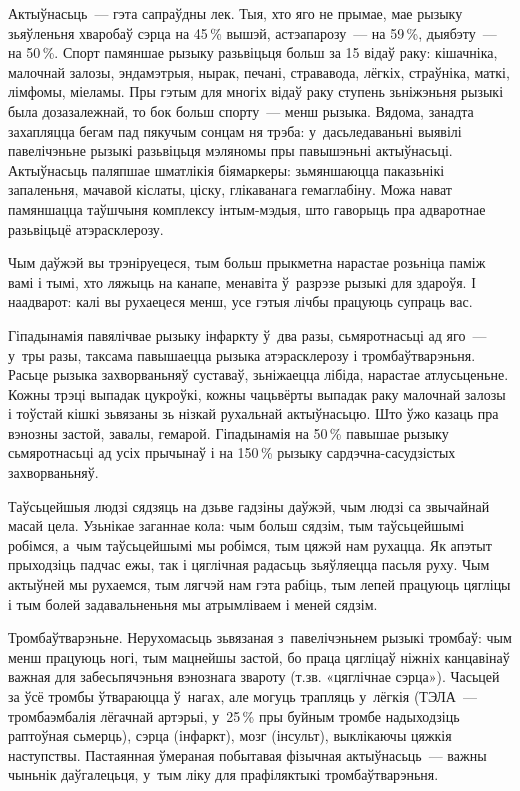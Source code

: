 Актыўнасьць~--- гэта сапраўдны лек. Тыя, хто яго не прымае, мае рызыку зьяўленьня хваробаў сэрца на 45\,\% вышэй, астэапарозу~--- на 59\,\%, дыябэту~--- на 50\,\%. Спорт памяншае рызыку разьвіцьця больш за 15 відаў раку: кішачніка, малочнай залозы, эндамэтрыя, нырак, печані, стрававода, лёгкіх, страўніка, маткі, лімфомы, міеламы. Пры гэтым для многіх відаў раку ступень зьніжэньня рызыкі была дозазалежнай, то бок больш спорту~--- менш рызыка. Вядома, занадта захапляцца бегам пад пякучым сонцам ня трэба: у~дасьледаваньні выявілі павелічэньне рызыкі разьвіцьця мэляномы пры павышэньні актыўнасьці. Актыўнасьць паляпшае шматлікія біямаркеры: зьмяншаюцца паказьнікі запаленьня, мачавой кіслаты, ціску, глікаванага гемаглабіну. Можа нават памяншацца таўшчыня комплексу інтым-мэдыя, што гаворыць пра адваротнае разьвіцьцё атэрасклерозу.

Чым даўжэй вы трэніруецеся, тым больш прыкметна нарастае розьніца паміж вамі і тымі, хто ляжыць на канапе, менавіта ў~разрэзе рызыкі для здароўя. І наадварот: калі вы рухаецеся менш, усе гэтыя лічбы працуюць супраць вас.

Гіпадынамія павялічвае рызыку інфаркту ў~два разы, сьмяротнасьці ад яго~--- у~тры разы, таксама павышаецца рызыка атэрасклерозу і тромбаўтварэньня. Расьце рызыка захворваньняў суставаў, зьніжаецца лібіда, нарастае атлусьценьне. Кожны трэці выпадак цукроўкі, кожны чацьвёрты выпадак раку малочнай залозы і тоўстай кішкі зьвязаны зь нізкай рухальнай актыўнасьцю. Што ўжо казаць пра вэнозны застой, завалы, гемарой. Гіпадынамія на 50\,\% павышае рызыку сьмяротнасьці ад усіх прычынаў і на 150\,\% рызыку сардэчна-сасудзістых захворваньняў.

Таўсьцейшыя людзі сядзяць на дзьве гадзіны даўжэй, чым людзі са звычайнай масай цела. Узьнікае заганнае кола: чым больш сядзім, тым таўсьцейшымі робімся, а~чым таўсьцейшымі мы робімся, тым цяжэй нам рухацца. Як апэтыт прыходзіць падчас ежы, так і цяглічная радасьць зьяўляецца пасьля руху. Чым актыўней мы рухаемся, тым лягчэй нам гэта рабіць, тым лепей працуюць цягліцы і тым болей задавальненьня мы атрымліваем і меней сядзім.

Тромбаўтварэньне. Нерухомасьць зьвязаная з~павелічэньнем рызыкі тромбаў: чым менш працуюць ногі, тым мацнейшы застой, бо праца цягліцаў ніжніх канцавінаў важная для забесьпячэньня вэнознага звароту (т.зв. «цяглічнае сэрца»). Часьцей за ўсё тромбы ўтвараюцца ў~нагах, але могуць трапляць у~лёгкія (ТЭЛА~--- тромбаэмбалія лёгачнай артэрыі, у~25\,\% пры буйным тромбе надыходзіць раптоўная сьмерць), сэрца (інфаркт), мозг (інсульт), выклікаючы цяжкія наступствы. Пастаянная ўмераная побытавая фізычная актыўнасьць~--- важны чыньнік даўгалецьця, у~тым ліку для прафіляктыкі тромбаўтварэньня.

